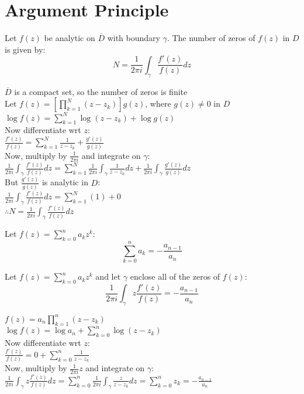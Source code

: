 \documentclass[letterpaper,12pt,fleqn]{article}
\newcommand{\g}{\gamma}
\begin{document}
\section*{Argument Principle}

\begin{theorem}
  Let $f(z)$ be analytic on $\overline{D}$ with boundary $\g$. The number of
  zeros of $f(z)$ in $D$ is given by:
  \[N=\frac{1}{2\pi i}\int_{\g}\frac{f'(z)}{f(z)}dz\]
\end{theorem}

\begin{theproof}
  $\overline{D}$ is a compact set, so the number of zeros is finite \\
  Let $f(z)=\left[\prod_{k=1}^N(z-z_k)\right]g(z)$, where $g(z)\ne0$ in $D$ \\
  $\log{f(z)}=\sum_{k=1}^N\log{(z-z_k)}+\log{g(z)}$ \\
  Now differentiate wrt $z$: \\
  $\frac{f'(z)}{f(z)}=\sum_{k=1}^N\frac{1}{z-z_k}+\frac{g'(z)}{g(z)}$ \\
  Now, multiply by $\frac{1}{2\pi i}$ and integrate on $\g$: \\
  $\frac{1}{2\pi i}\int_{\g}\frac{f'(z)}{f(z)}dz=
  \sum_{k=1}^N\frac{1}{2\pi i}\int_{\g}\frac{1}{z-z_k}dz+
  \frac{1}{2\pi i}\int_{\g}\frac{g'(z)}{g(z)}dz$ \\
  But $\frac{g'(z)}{g(z)}$ is analytic in $D$: \\
  $\frac{1}{2\pi i}\int_{\g}\frac{f'(z)}{f(z)}dz=\sum_{k=1}^N(1)+0$ \\
  $\therefore N=\frac{1}{2\pi i}\int_{\g}\frac{f'(z)}{f(z)}dz$
\end{theproof}

\begin{theorem}[Newton]
  Let $f(z)=\sum_{k=0}^na_kz^k$:
  \[\sum_{k=0}^na_k=-\frac{a_{n-1}}{a_n}\]
\end{theorem}

\begin{theorem}
  Let $f(z)=\sum_{k=0}^na_kz^k$ and let $\g$ enclose all of the zeros of
  $f(z)$:
  \[\frac{1}{2\pi i}\int_{\g}z\frac{f'(z)}{f(z)}=-\frac{a_{n-1}}{a_n}\]
\end{theorem}

\begin{theproof}
  $f(z)=a_n\prod_{k=1}^n(z-z_k)$ \\
  $\log{f(z)}=\log{a_n}+\sum_{k=0}^n\log{(z-z_k)}$ \\
  Now differentiate wrt $z$: \\
  $\frac{f'(z)}{f(z)}=0+\sum_{k=0}^n\frac{1}{z-z_k}$ \\
  Now, multiply by $\frac{1}{2\pi i}z$ and integrate on $\g$: \\
  $\frac{1}{2\pi i}\int_{\g}z\frac{f'(z)}{f(z)}dz=
  \sum_{k=0}^n\frac{1}{2\pi i}\int_{\g}\frac{z}{z-z_k}dz=
  \sum_{k=0}^nz_k=-\frac{a_{n-1}}{a_n}$
\end{theproof}
\end{document}
